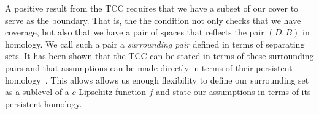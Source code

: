 
A positive result from the TCC requires that we have a subset of our cover to serve as the boundary.
That is, the the condition not only checks that we have coverage, but also that we have a pair of spaces that reflects the pair $(D, B)$ in homology.
We call such a pair a \emph{surrounding pair} defined in terms of separating sets.
It has been shown that the TCC can be stated in terms of these surrounding pairs and that assumptions can be made directly in terms of their persistent homology~\cite{cavanna2017when}.
This allows allows us enough flexibility to define our surrounding set as a sublevel of a $c$-Lipschitz function $f$ and state our assumptions in terms of its persistent homology.
